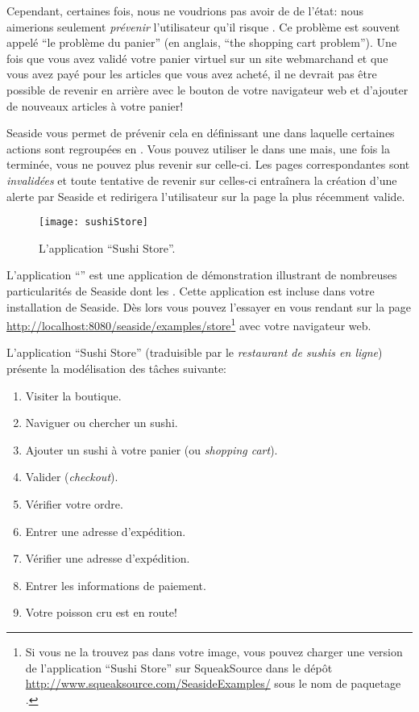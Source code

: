 \documentclass[a4paper,10pt,twoside]{book}
\begin{document}
Cependant, certaines fois, nous ne voudrions pas avoir de \backtracking
de l'état: nous aimerions seulement \emph{prévenir} l'utilisateur
qu'il risque .
Ce problème est souvent appelé ``le problème du panier'' (en anglais, ``the
shopping cart problem'').
Une fois que vous avez validé votre panier virtuel 
sur un site webmarchand
et que vous avez payé pour les articles que vous avez acheté, il ne
devrait pas être possible de revenir en arrière avec le bouton
\backbtn{} de votre navigateur web et d'ajouter de nouveaux articles à
votre panier!

Seaside vous permet de prévenir cela en définissant une \task 
dans laquelle certaines actions sont regroupées en \transactions.
Vous pouvez utiliser le \backtracking{} dans une \transaction mais,
une fois la \transaction terminée, vous ne pouvez plus revenir sur
celle-ci.
Les pages correspondantes sont \emph{invalidées} et toute tentative
de revenir sur celles-ci entraînera la création d'une alerte par
Seaside et redirigera l'utilisateur sur la page la plus récemment valide.

\begin{figure}[ht]
\begin{center}
\texttt{[image: sushiStore]}
\caption{L'application ``Sushi Store''.}
\end{center}
\end{figure}

L'application ``'' est une
application de démonstration illustrant de nombreuses particularités
de Seaside dont les \transactions.
Cette application est incluse dans votre installation de Seaside. Dès
lors vous pouvez l'essayer en vous rendant sur la page 
\url{http://localhost:8080/seaside/examples/store}\footnote{%
Si vous ne la trouvez pas dans votre image, vous pouvez charger une
version de l'application ``Sushi Store'' sur SqueakSource dans le dépôt
  \url{http://www.squeaksource.com/SeasideExamples/}
sous le nom de paquetage %
.} avec votre navigateur web.

L'application ``Sushi Store''
(traduisible par le \emph{restaurant de sushis en ligne})
présente la modélisation des tâches suivante:
\begin{enumerate}[itemsep=0pt]
  \item Visiter la boutique.
  \item Naviguer ou chercher un sushi.
  \item Ajouter un sushi à votre panier (ou \emph{shopping cart}).
  \item Valider (\emph{checkout}).
  \item Vérifier votre ordre.
  \item Entrer une adresse d'expédition.
  \item Vérifier une adresse d'expédition.
  \item Entrer les informations de paiement.
  \item Votre poisson cru est en route!
\end{enumerate}
\end{document}
